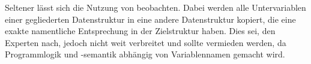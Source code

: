 Seltener lässt sich die Nutzung von  beobachten. Dabei werden alle Untervariablen einer gegliederten Datenstruktur in eine andere Datenstruktur kopiert, die eine exakte namentliche Entsprechung in der Zielstruktur haben. Dies sei, den Experten nach, jedoch nicht weit verbreitet und sollte vermieden werden, da Programmlogik und -semantik abhängig von Variablennamen gemacht wird.